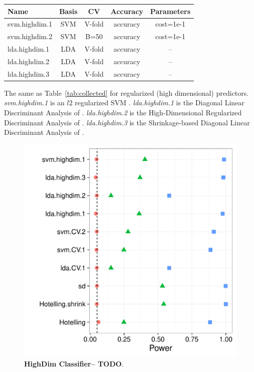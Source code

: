 \documentclass[12pt,a4paper]{article}
\theoremstyle{definition}
\begin{document}
\begin{tcolorbox}
\centering
\begin{tabular}{l|c|c|c|c}
Name & Basis & CV & Accuracy & Parameters\\ 
\hline
\hline
svm.highdim.1 & SVM & V-fold & accuracy & cost=1e-1 \\ 
svm.highdim.2 & SVM & B=50 & accuracy & cost=1e-1 \\ 
lda.highdim.1 & LDA & V-fold & accuracy & -- \\ 
lda.highdim.2 & LDA & V-fold & accuracy & -- \\ 
lda.highdim.3 & LDA & V-fold & accuracy & -- \\ 
\end{tabular} 
\captionsetup{type=table}
\caption{
The same as Table~\ref{tab:collected} for regularized (high dimensional) predictors. 
\emph{svm.highdim.1} is an $l2$ regularized SVM \cite{friedman_regularization_2010}. 
\emph{lda.highdim.1} is the Diagonal Linear Discriminant Analysis of \cite{dudoit_comparison_2002}.
\emph{lda.highdim.2} is the High-Dimensional Regularized Discriminant Analysis of \cite{ramey_high-dimensional_2016}.
\emph{lda.highdim.3} is the Shrinkage-based Diagonal Linear Discriminant Analysis of \cite{pang_shrinkage-based_2009}.
} 
\label{tab:collected_3}
\end{tcolorbox}



\begin{figure}[ht]
\centering
	  \includegraphics[width=0.7\linewidth]{"art/2016-08-12 07:38:43"}
	  \caption{\textbf{HighDim Classifier-- TODO}. } %
	\label{fig:highdim}
\end{figure}
\end{document}
